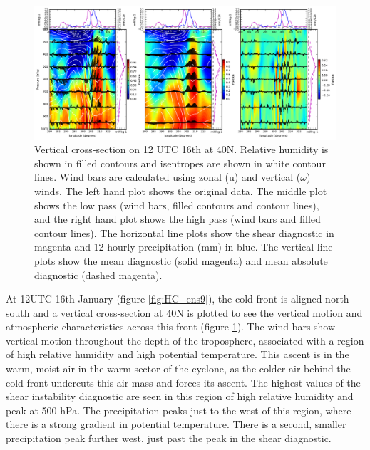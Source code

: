 
\begin{figure}[h]	
	\includegraphics[width=40pc,angle=0]{cx3_sub_u_RH_pt_ens9_40N_12UTC_16th.png} %
	\caption{Vertical cross-section on 12 UTC 16th at 40N. Relative humidity is shown in filled contours and isentropes are shown in white contour lines. Wind bars are calculated using zonal (u) and vertical ($\omega$) winds. The left hand plot shows the original data. The middle plot shows the low pass (wind bars, filled contours and contour lines), and the right hand plot shows the high pass (wind bars and filled contour lines). The horizontal line plots show the shear diagnostic in magenta and 12-hourly precipitation (mm) in blue. The vertical line plots show the mean diagnostic (solid magenta) and mean absolute diagnostic (dashed magenta).}\label{fig:HC_cxA}
	\centering
\end{figure}

At 12UTC 16th January (figure \ref{fig:HC_ens9}), the cold front is aligned north-south and a vertical cross-section at 40N is plotted to see the vertical motion and atmospheric characteristics across this front (figure \ref{fig:HC_cxA}). The wind bars show vertical motion throughout the depth of the troposphere, associated with a region of high relative humidity and high potential temperature. This ascent is in the warm, moist air in the warm sector of the cyclone, as the colder air behind the cold front undercuts this air mass and forces its ascent. The highest values of the shear instability diagnostic are seen in this region of high relative humidity and peak at 500 hPa. The precipitation peaks just to the west of this region, where there is a strong gradient in potential temperature. There is a second, smaller precipitation peak further west, just past the peak in the shear diagnostic.

